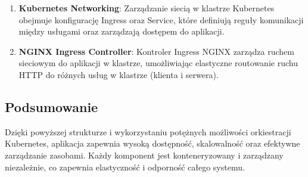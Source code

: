 \documentclass[12pt,a4paper]{article}
\begin{document}
\begin{enumerate}
    \item \textbf{Kubernetes Networking}: Zarządzanie siecią w klastrze Kubernetes obejmuje konfigurację Ingress oraz Service, które definiują reguły komunikacji między usługami oraz zarządzają dostępem do aplikacji.
    
    \item \textbf{NGINX Ingress Controller}: Kontroler Ingress NGINX zarządza ruchem sieciowym do aplikacji w klastrze, umożliwiając elastyczne routowanie ruchu HTTP do różnych usług w klastrze (klienta i serwera).
\end{enumerate}

\subsection{Podsumowanie}
\label{sec:ExampleResults}
Dzięki powyższej strukturze i wykorzystaniu potężnych możliwości orkiestracji Kubernetes, aplikacja zapewnia wysoką dostępność, skalowalność oraz efektywne zarządzanie zasobami. Każdy komponent jest konteneryzowany i zarządzany niezależnie, co zapewnia elastyczność i odporność całego systemu.

\noindent



\nocite{*}
\end{document}
